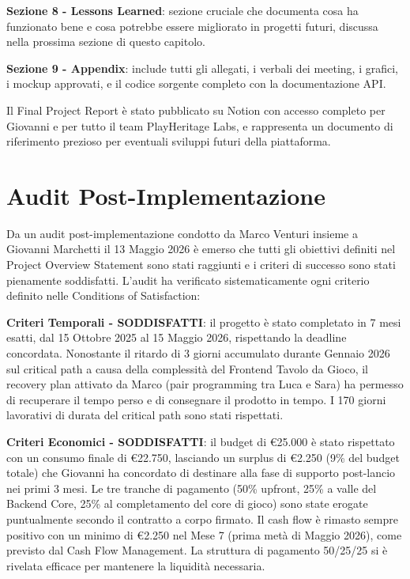 \textbf{Sezione 8 - Lessons Learned}: sezione cruciale che documenta cosa ha funzionato bene e cosa potrebbe essere migliorato in progetti futuri, discussa nella prossima sezione di questo capitolo.

\textbf{Sezione 9 - Appendix}: include tutti gli allegati, i verbali dei meeting, i grafici, i mockup approvati, e il codice sorgente completo con la documentazione API.

Il Final Project Report è stato pubblicato su Notion con accesso completo per Giovanni e per tutto il team PlayHeritage Labs, e rappresenta un documento di riferimento prezioso per eventuali sviluppi futuri della piattaforma.

\section{Audit Post-Implementazione}

Da un audit post-implementazione condotto da Marco Venturi insieme a Giovanni Marchetti il 13 Maggio 2026 è emerso che tutti gli obiettivi definiti nel Project Overview Statement sono stati raggiunti e i criteri di successo sono stati pienamente soddisfatti. L'audit ha verificato sistematicamente ogni criterio definito nelle Conditions of Satisfaction:

\textbf{Criteri Temporali - SODDISFATTI}: il progetto è stato completato in 7 mesi esatti, dal 15 Ottobre 2025 al 15 Maggio 2026, rispettando la deadline concordata. Nonostante il ritardo di 3 giorni accumulato durante Gennaio 2026 sul critical path a causa della complessità del Frontend Tavolo da Gioco, il recovery plan attivato da Marco (pair programming tra Luca e Sara) ha permesso di recuperare il tempo perso e di consegnare il prodotto in tempo. I 170 giorni lavorativi di durata del critical path sono stati rispettati.

\textbf{Criteri Economici - SODDISFATTI}: il budget di €25.000 è stato rispettato con un consumo finale di €22.750, lasciando un surplus di €2.250 (9\% del budget totale) che Giovanni ha concordato di destinare alla fase di supporto post-lancio nei primi 3 mesi. Le tre tranche di pagamento (50\% upfront, 25\% a valle del Backend Core, 25\% al completamento del core di gioco) sono state erogate puntualmente secondo il contratto a corpo firmato. Il cash flow è rimasto sempre positivo con un minimo di €2.250 nel Mese 7 (prima metà di Maggio 2026), come previsto dal Cash Flow Management. La struttura di pagamento 50/25/25 si è rivelata efficace per mantenere la liquidità necessaria.

